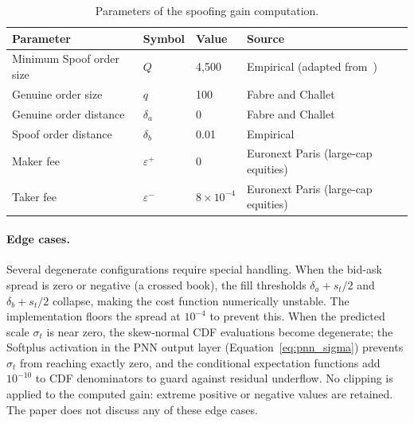 \documentclass[11pt]{report}
\begin{document}
\begin{table}[H]
\centering
\caption{Parameters of the spoofing gain computation.}
\label{tab:spoofing_params}
\begin{tabular}{llll}
\toprule
\textbf{Parameter} & \textbf{Symbol} & \textbf{Value} & \textbf{Source} \\
\midrule
Minimum Spoof order size & $Q$ & 4{,}500 & Empirical (adapted from~\cite{fabre_2025}) \\
Genuine order size & $q$ & 100 & Fabre and Challet~\cite{fabre_2025} \\
Genuine order distance & $\delta_a$ & 0 & Fabre and Challet~\cite{fabre_2025} \\
Spoof order distance & $\delta_b$ & 0.01 & Empirical \\
Maker fee & $\varepsilon^+$ & 0 & Euronext Paris (large-cap equities) \\
Taker fee & $\varepsilon^-$ & $8 \times 10^{-4}$ & Euronext Paris (large-cap equities) \\
\bottomrule
\end{tabular}
\end{table}

\paragraph{Edge cases.}
Several degenerate configurations require special handling. When the bid-ask spread is zero or negative (a crossed book), the fill thresholds $\delta_a + s_t/2$ and $\delta_b + s_t/2$ collapse, making the cost function numerically unstable. The implementation floors the spread at $10^{-4}$ to prevent this. When the predicted scale $\sigma_t$ is near zero, the skew-normal CDF evaluations become degenerate; the Softplus activation in the PNN output layer (Equation~\eqref{eq:pnn_sigma}) prevents $\sigma_t$ from reaching exactly zero, and the conditional expectation functions add $10^{-10}$ to CDF denominators to guard against residual underflow. No clipping is applied to the computed gain: extreme positive or negative values are retained. The paper does not discuss any of these edge cases.
\end{document}
